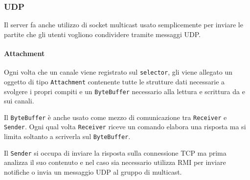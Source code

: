 \subsubsection{UDP}
Il server fa anche utilizzo di socket multicast usato semplicemente per inviare le partite che gli
utenti vogliono condividere tramite messaggi UDP.

\paragraph{Attachment}
Ogni volta che un canale viene registrato sul \verb|selector|, gli viene allegato un oggetto di
tipo \verb|Attachment| contenente tutte le strutture dati necessarie a svolgere i propri compiti
e un \verb|ByteBuffer| necessario alla lettura e scrittura da e sui canali.

Il \verb|ByteBuffer| è anche usato come mezzo di comunicazione tra \verb|Receiver| e
\verb|Sender|. Ogni qual volta \verb|Receiver| riceve un comando elabora una risposta ma si limita
soltanto a scriverla sul \verb|ByteBuffer|.

Il \verb|Sender| si occupa di inviare la risposta sulla connessione TCP ma prima analizza il suo
contenuto e nel caso sia necessario utilizza RMI per inviare notifiche o invia un messaggio UDP al
gruppo di multicast.